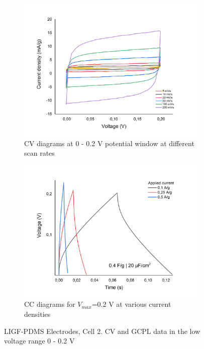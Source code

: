 \begin{figure}[H]
\begin{subfigure}{0.49\textwidth}
\includegraphics[width=1\textwidth]{Figures/Results/Electrochemistry/LIGF-PDMS-NaNO3-Swagelok/Cell2/CV-V02-Cell2.jpg} 
\captionsetup{width=0.9\linewidth}
\caption{CV diagrams at 0 - 0.2 V potential window at different scan rates}
\label{fig:LIGF-PDMS-cell2-CV02}
\end{subfigure}
\begin{subfigure}{0.49\textwidth}
\includegraphics[width=1\textwidth]{Figures/Results/Electrochemistry/LIGF-PDMS-NaNO3-Swagelok/Cell2/GCPL_V02_Cell2.jpg}
\captionsetup{width=0.9\linewidth}
\caption{CC diagrams for $V_{max}$=0.2 V at various current densities}
\label{fig:LIGF-PDMS-cell2-CC02}
\end{subfigure}
\medskip
\caption{LIGF-PDMS Electrodes, Cell 2. CV and GCPL data in the low voltage range 0 - 0.2 V}
\label{fig:LIGF-PDMS-cell2-02}
\end{figure}

